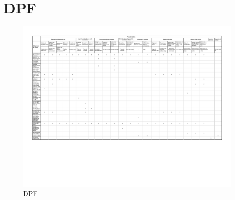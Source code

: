 \chapter{DPF}
\label{annexe_dpf}
\begin{figure}[h]
  \centering
  \includegraphics[scale=0.6, trim = 0mm 40mm 0mm 0mm, clip]{resources/dpf.pdf}
  \caption{DPF}
\end{figure}
